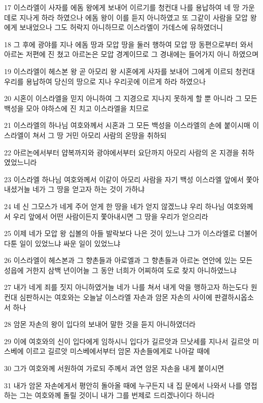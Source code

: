 \par 17 이스라엘이 사자를 에돔 왕에게 보내어 이르기를 청컨대 나를 용납하여 네 땅 가운데로 지나게 하라 하였으나 에돔 왕이 이를 듣지 아니하였고 또 그같이 사람을 모압 왕에게 보내었으나 그도 허락지 아니하므로 이스라엘이 가데스에 유하였더니
\par 18 그 후에 광야를 지나 에돔 땅과 모압 땅을 둘러 행하여 모압 땅 동편으로부터 와서 아르논 저편에 진 쳤고 아르논은 모압 경계이므로 그 경내에는 들어가지 아니 하였으며
\par 19 이스라엘이 헤스본 왕 곧 아모리 왕 시혼에게 사자를 보내어 그에게 이르되 청컨대 우리를 용납하여 당신의 땅으로 지나 우리곳에 이르게 하라 하였으나
\par 20 시혼이 이스라엘을 믿지 아니하여 그 지경으로 지나지 못하게 할 뿐 아니라 그 모든 백성을 모아 야하스에 진 치고 이스라엘을 치므로
\par 21 이스라엘의 하나님 여호와께서 시혼과 그 모든 백성을 이스라엘의 손에 붙이시매 이스라엘이 쳐서 그 땅 거민 아모리 사람의 온땅을 취하되
\par 22 아르논에서부터 얍복까지와 광야에서부터 요단까지 아모리 사람의 온 지경을 취하였었느니라
\par 23 이스라엘 하나님 여호와께서 이같이 아모리 사람을 자기 백성 이스라엘 앞에서 쫓아내셨거늘 네가 그 땅을 얻고자 하는 것이 가하냐
\par 24 네 신 그모스가 네게 주어 얻게 한 땅을 네가 얻지 않겠느냐 우리 하나님 여호와께서 우리 앞에서 어떤 사람이든지 쫓아내시면 그 땅을 우리가 얻으리라
\par 25 이제 네가 모압 왕 십볼의 아들 발락보다 나은 것이 있느냐 그가 이스라엘로 더불어 다툰 일이 있었느냐 싸운 일이 있었느냐
\par 26 이스라엘이 헤스본과 그 향촌들과 아로엘과 그 향촌들과 아르논 연안에 있는 모든 성읍에 거한지 삼백 년이어늘 그 동안 너희가 어찌하여 도로 찾지 아니하였느냐
\par 27 내가 네게 죄를 짓지 아니하였거늘 네가 나를 쳐서 내게 악을 행하고자 하는도다 원컨대 심판하시는 여호와는 오늘날 이스라엘 자손과 암몬 자손의 사이에 판결하시옵소서 하나
\par 28 암몬 자손의 왕이 입다의 보내어 말한 것을 듣지 아니하였더라
\par 29 이에 여호와의 신이 입다에게 임하시니 입다가 길르앗과 므낫세를 지나서 길르앗 미스베에 이르고 길르앗 미스베에서부터 암몬 자손들에게로 나아갈 때에
\par 30 그가 여호와께 서원하여 가로되 주께서 과연 암몬 자손을 내게 붙이시면
\par 31 내가 암몬 자손에게서 평안히 돌아올 때에 누구든지 내 집 문에서 나와서 나를 영접하는 그는 여호와께 돌릴 것이니 내가 그를 번제로 드리겠나이다 하니라
